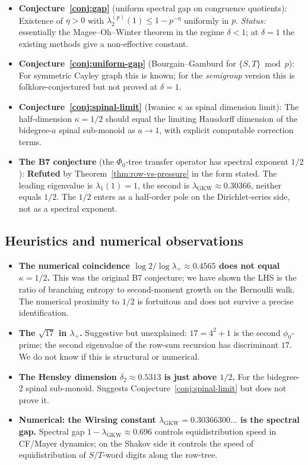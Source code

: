 ﻿\documentclass[11pt]{article}
\theoremstyle{definition}
\newcommand{\Phio}{\Phi_0}
\newcommand{\GKW}{\mathrm{GKW}}
\begin{document}
\begin{itemize}
\item \textbf{Conjecture~\ref{conj:gap}} (uniform spectral gap on congruence quotients): Existence of $\eta>0$ with $\lambda_2^{(p)}(1)\le 1-p^{-\eta}$ uniformly in $p$. \emph{Status:} essentially the Magee--Oh--Winter theorem in the regime $\delta<1$; at $\delta=1$ the existing methods give a non-effective constant.
\item \textbf{Conjecture~\ref{conj:uniform-gap}} (Bourgain--Gamburd for $\{S,T\}\bmod p$): For symmetric Cayley graph this is known; for the \emph{semigroup} version this is folklore-conjectured but not proved at $\delta=1$.
\item \textbf{Conjecture~\ref{conj:spinal-limit}} (Iwaniec $\kappa$ as spinal dimension limit): The half-dimension $\kappa=1/2$ should equal the limiting Hausdorff dimension of the bidegree-$a$ spinal sub-monoid as $a\to 1$, with explicit computable correction terms.
\item \textbf{The B7 conjecture} (the $\Phio$-tree transfer operator has spectral exponent $1/2$): \textbf{Refuted} by Theorem~\ref{thm:row-vs-pressure} in the form stated. The leading eigenvalue is $\lambda_1(1)=1$, the second is $\lambda_\GKW\approx 0.30366$, neither equals $1/2$. The $1/2$ enters as a half-order pole on the Dirichlet-series side, not as a spectral exponent.
\end{itemize}

\subsection{Heuristics and numerical observations}

\begin{itemize}
\item \textbf{The numerical coincidence $\log 2/\log\lambda_+\approx 0.4565$ does not equal $\kappa=1/2$.} This was the original B7 conjecture; we have shown the LHS is the ratio of branching entropy to second-moment growth on the Bernoulli walk. The numerical proximity to $1/2$ is fortuitous and does not survive a precise identification.
\item \textbf{The $\sqrt{17}$ in $\lambda_+$.} Suggestive but unexplained: $17=4^2+1$ is the second $\phi_0$-prime; the second eigenvalue of the row-sum recursion has discriminant $17$. We do not know if this is structural or numerical.
\item \textbf{The Hensley dimension $\delta_2\approx 0.5313$ is just above $1/2$.} For the bidegree-$2$ spinal sub-monoid. Suggests Conjecture~\ref{conj:spinal-limit} but does not prove it.
\item \textbf{Numerical: the Wirsing constant $\lambda_\GKW=0.30366300\ldots$ is the spectral gap.} Spectral gap $1-\lambda_\GKW\approx 0.696$ controls equidistribution speed in CF/Mayer dynamics; on the Shakov side it controls the speed of equidistribution of $S/T$-word digits along the row-tree.
\end{itemize}
\end{document}
